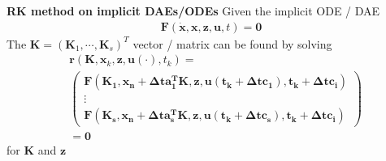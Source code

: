 \textbf{RK method on implicit DAEs/ODEs}
Given the implicit ODE / DAE
\begin{align*}
    \bm{F}(\dot{\bm{x}},\bm{x},\bm{z},\bm{u},t) = \bm{0}
\end{align*}
The \(\bm{K}=(\bm{K}_1,\cdots,\bm{K}_s)^T\) vector / matrix can be found by solving
\begin{align*}
    & \bm{r}(\bm{K},\bm{x}_k,\bm{z},\bm{u}(\cdot),t_k) = \\ 
    & \begin{pmatrix}
        \bm{F(\bm{K}_1,\bm{x}_n+\Delta t\bm{a}_1^T\bm{K},\bm{z},\bm{u}(t_k+\Delta t c_1),t_k+\Delta t c_i)} \\ \vdots \\
        \bm{F(\bm{K}_s,\bm{x}_n+\Delta t\bm{a}_s^T\bm{K},\bm{z},\bm{u}(t_k+\Delta t c_s),t_k+\Delta t c_i)}
    \end{pmatrix} \\ &= \bm{0}
\end{align*}
for \(\bm{K}\) and \(\bm{z}\)









